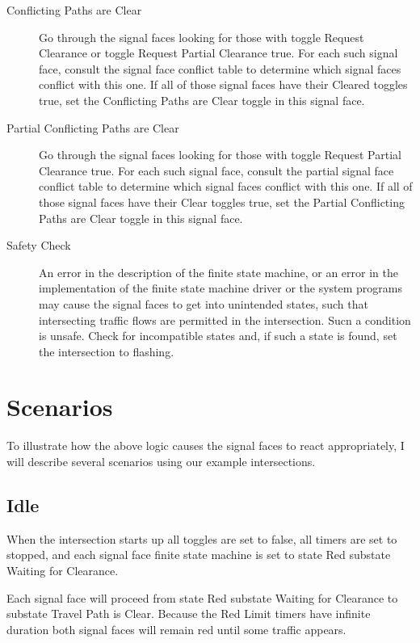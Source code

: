 \documentclass[letterpaper,twoside]{article}
\begin{document}
\begin{description}
\item[Conflicting Paths are Clear]

Go through the signal faces looking for those with toggle Request Clearance
or toggle Request Partial Clearance
true.  For each such signal face, consult the signal face conflict table
to determine which signal faces conflict with this one.  If all of those
signal faces have their Cleared toggles true, set the Conflicting Paths
are Clear toggle in this signal face.

\item[Partial Conflicting Paths are Clear]

Go through the signal faces looking for those with toggle Request Partial
Clearance true.  For each such signal face, consult the partial
signal face conflict table to determine which signal faces conflict
with this one.  If all of those signal faces have their Clear toggles
true, set the Partial Conflicting Paths are Clear toggle in this
signal face.

\item[Safety Check]

An error in the description of the finite state machine, or an error
in the implementation of the finite state machine driver or the
system programs may cause the signal faces to get into unintended
states, such that intersecting traffic flows are permitted in the
intersection.  Sucn a condition is unsafe.  Check for incompatible
states and, if such a state is found, set the intersection to flashing.

\end{description}

\section{Scenarios}

To illustrate how the above logic causes the signal faces to react
appropriately, I will describe several scenarios using our example
intersections.

\subsection{Idle}

When the intersection starts up all toggles are set to false,
all timers are set to stopped, and each signal face finite state machine
is set to state Red substate Waiting for Clearance.

Each signal face will proceed
from state Red substate Waiting for Clearance to substate Travel Path is Clear.
Because the Red Limit timers have infinite duration both signal faces
will remain red until some traffic appears.
\end{document}
